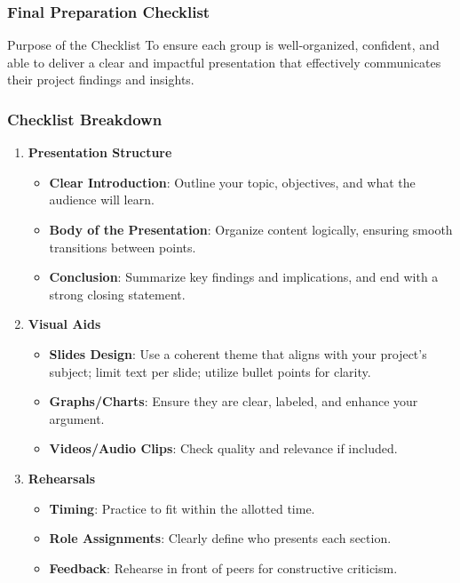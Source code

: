 \documentclass[aspectratio=169]{beamer}
\begin{document}
\begin{frame}[fragile]
    \frametitle{Final Preparation Checklist}
    \begin{block}{Purpose of the Checklist}
        To ensure each group is well-organized, confident, and able to deliver a clear and impactful presentation that effectively communicates their project findings and insights.
    \end{block}
\end{frame}

\begin{frame}[fragile]
    \frametitle{Checklist Breakdown}
    \begin{enumerate}
        \item \textbf{Presentation Structure}
            \begin{itemize}
                \item \textbf{Clear Introduction}: Outline your topic, objectives, and what the audience will learn.
                \item \textbf{Body of the Presentation}: Organize content logically, ensuring smooth transitions between points.
                \item \textbf{Conclusion}: Summarize key findings and implications, and end with a strong closing statement.
            \end{itemize}

        \item \textbf{Visual Aids}
            \begin{itemize}
                \item \textbf{Slides Design}: Use a coherent theme that aligns with your project's subject; limit text per slide; utilize bullet points for clarity.
                \item \textbf{Graphs/Charts}: Ensure they are clear, labeled, and enhance your argument.
                \item \textbf{Videos/Audio Clips}: Check quality and relevance if included.
            \end{itemize}

        \item \textbf{Rehearsals}
            \begin{itemize}
                \item \textbf{Timing}: Practice to fit within the allotted time.
                \item \textbf{Role Assignments}: Clearly define who presents each section.
                \item \textbf{Feedback}: Rehearse in front of peers for constructive criticism.
            \end{itemize}
    \end{enumerate}
\end{frame}
\end{document}
